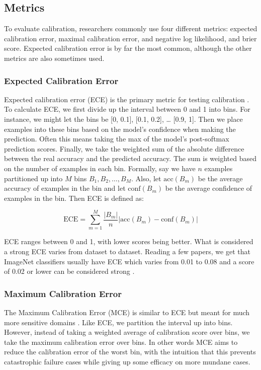 \documentclass{article}
\newcommand{\acc}{\text{acc}}
\newcommand{\conf}{\text{conf}}
\begin{document}
\subsection{Metrics}
To evaluate calibration, researchers commonly use four different metrics: expected calibration error, maximal calibration error, and negative log likelihood, and brier score. Expected calibration error is by far the most common, although the other metrics are also sometimes used.

\subsubsection{Expected Calibration Error}
Expected calibration error (ECE) is the primary metric for testing calibration \cite{naeini2015obtaining}. To calculate ECE, we first divide up the interval between 0 and 1 into bins. For instance, we might let the bins be [0, 0.1], [0.1, 0.2], … [0.9, 1]. Then we place examples into these bins based on the model’s confidence when making the prediction. Often this means taking the max of the model’s post-softmax prediction scores. Finally, we take the weighted sum of the absolute difference between the real accuracy and the predicted accuracy. The sum is weighted based on the number of examples in each bin. Formally, say we have $n$ examples partitioned up into $M$ bins $B_1, B_2, …, B_M$. Also, let $\acc(B_m)$ be the average accuracy of examples in the bin and let $\conf(B_m)$ be the average confidence of examples in the bin. Then ECE is defined as:

\[
    \text{ECE} = \sum_{m=1}^M\frac{|B_m|}{n}\left|\acc(B_m) - \conf(B_m)\right|
\]

\noindent ECE ranges between 0 and 1, with lower scores being better. What is considered a strong ECE varies from dataset to dataset. Reading a few papers, we get that ImageNet classifiers usually have ECE which varies from 0.01 to 0.08 and a score of 0.02 or lower can be considered strong \cite{guo2017calibration, minderer2021revisiting}.

\subsubsection{Maximum Calibration Error}
The Maximum Calibration Error (MCE) is similar to ECE but meant for much more sensitive domains \cite{naeini2015obtaining}. Like ECE, we partition the interval up into bins. However, instead of taking a weighted average of calibration score over bins, we take the maximum calibration error over bins. In other words MCE aims to reduce the calibration error of the worst bin, with the intuition that this prevents catastrophic failure cases while giving up some efficacy on more mundane cases. 
\end{document}
